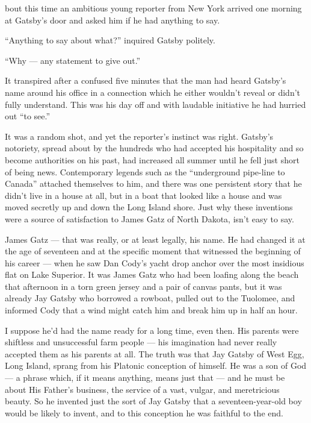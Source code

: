 \documentclass{znotebook}
\begin{document}
\lettrine[findent=2pt]{}{ }bout this time an ambitious young reporter from New York arrived one morning at Gatsby's door and asked him if he had anything to say.

``Anything to say about what?'' inquired Gatsby politely.

``Why — any statement to give out.''

It transpired after a confused five minutes that the man had heard Gatsby's name around his office in a connection which he either wouldn't reveal or didn't fully understand. This was his day off and with laudable initiative he had hurried out ``to see.''

It was a random shot, and yet the reporter's instinct was right. Gatsby's notoriety, spread about by the hundreds who had accepted his hospitality and so become authorities on his past, had increased all summer until he fell just short of being news. Contemporary legends such as the ``underground pipe-line to Canada'' attached themselves to him, and there was one persistent story that he didn't live in a house at all, but in a boat that looked like a house and was moved secretly up and down the Long Island shore. Just why these inventions were a source of satisfaction to James Gatz of North Dakota, isn't easy to say.

James Gatz — that was really, or at least legally, his name. He had changed it at the age of seventeen and at the specific moment that witnessed the beginning of his career — when he saw Dan Cody's yacht drop anchor over the most insidious flat on Lake Superior. It was James Gatz who had been loafing along the beach that afternoon in a torn green jersey and a pair of canvas pants, but it was already Jay Gatsby who borrowed a rowboat, pulled out to the Tuolomee, and informed Cody that a wind might catch him and break him up in half an hour.

I suppose he'd had the name ready for a long time, even then. His parents were shiftless and unsuccessful farm people — his imagination had never really accepted them as his parents at all. The truth was that Jay Gatsby of West Egg, Long Island, sprang from his Platonic conception of himself. He was a son of God — a phrase which, if it means anything, means just that — and he must be about His Father's business, the service of a vast, vulgar, and meretricious beauty. So he invented just the sort of Jay Gatsby that a seventeen-year-old boy would be likely to invent, and to this conception he was faithful to the end.
\end{document}
